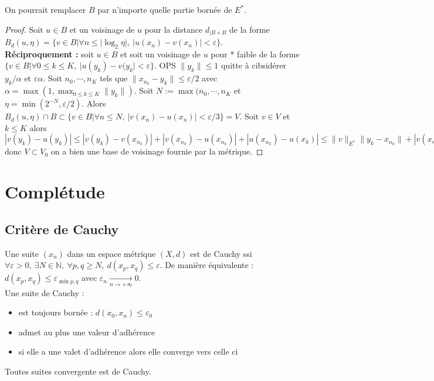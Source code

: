\begin{remarque}
    On pourrait remplacer $B$ par n'importe quelle partie bornée de $E^*$.
\end{remarque}

\begin{proof}
    Soit $u\in B$ et un voisinage de $u$ pour la distance $d_{|B\times B}$ de la forme $B_d(u, \eta)=\{v\in B| \forall n\le |\log_2\eta|,\ |u(x_{n})-v(x_{n})|<\varepsilon\} $.\\
    \textbf{Réciproquement :} soit $u\in B$ et soit un voisinage de $u$ pour * faible de la forme $\{v\in B|\forall 0\le k\le K,\ |u(y_{k})-v(y_{k}|<\varepsilon  \} $. OPS $\|y_k\|\le 1$ quitte à cibsidérer $y_k/\alpha $ et $\varepsilon \alpha $. Soit $n_0, \cdots, n_K$ tels que $\|x_{n_k}-y_k \|\le \varepsilon /2$ avec $\alpha =\max(1, \max_{0\le k\le K}\|y_k\|)$. Soit $N:=\max(n_0,\cdots,n_K$ et $\eta=\min(2^{-N},\varepsilon /2)$. Alors $B_d(u, \eta)\cap B\subset \{v\in B| \forall n\le N,\ |v(x_{n})-u(x_{n})|<\varepsilon /3 \} =V$. Soit $v\in V$ et $k\le K$ alors $|v(y_k)-u(y_k)|\le |v(y_k)-v(x_{n_k})|+|v(x_{n_k})-u(x_{n_k})|+|u(x_{n_k})-u(x_k)|\le \|v\|_{E^*}\|y_k-x_{n_k}\|+|v(x_{n_k})-u(x_{n_k})|+\|u\|_{E^*}\|y_k-x_{n_k}\|\le 1*\varepsilon /3+\varepsilon /3 +1*\varepsilon /3<\varepsilon $ donc $V\subset V_0$ on a bien une base de voisinage fournie par la métrique.
\end{proof}


\section{Complétude}
\subsection{Critère de Cauchy}
Une suite $(x_{n})$ dans un espace métrique $(X,d)$ est de Cauchy ssi $\forall \varepsilon >0,\ \exists N\in \mathbb{N} ,\ \forall p,q\ge N,\ d(x_p,x_q)\le \varepsilon $. De manière équivalente : $d(x_p,x_q)\le \varepsilon _{\min p,q}$ avec $\varepsilon _n \xrightarrow[n\to +\infty]{} 0$.\\

Une suite de Cauchy :
\begin{itemize}
    \item est toujours bornée : $d(x_0,x_n)\le \varepsilon _0$
    \item admet au plus une valeur d'adhérence
    \item si elle a une valet d'adhérence alors elle converge vers celle ci
\end{itemize}
Toutes suites convergente est de Cauchy.

